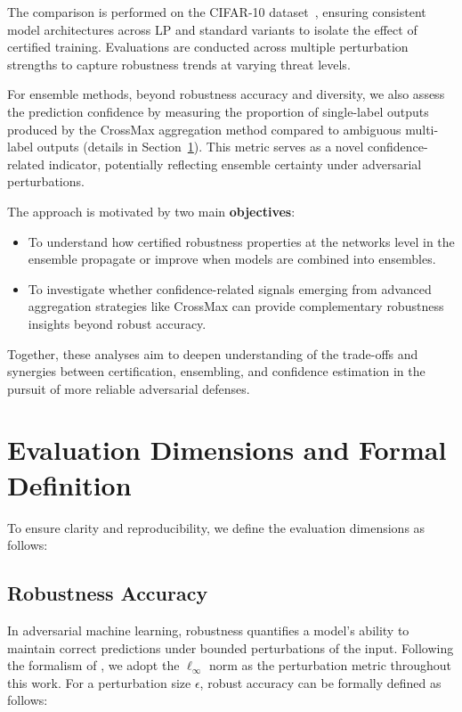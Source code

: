 The comparison is performed on the CIFAR-10 dataset~\cite{krizhevsky2009learning}, ensuring consistent model architectures across LP and standard variants to isolate the effect of certified training. Evaluations are conducted across multiple perturbation strengths to capture robustness trends at varying threat levels.

For ensemble methods, beyond robustness accuracy and diversity, we also assess the prediction confidence by measuring the proportion of single-label outputs produced by the CrossMax aggregation method compared to ambiguous multi-label outputs (details in Section~\ref{sec:evaluation dimensions}). This metric serves as a novel confidence-related indicator, potentially reflecting ensemble certainty under adversarial perturbations.

The approach is motivated by two main \textbf{objectives}:
\begin{itemize}

    \item To understand how certified robustness properties at the networks  level in the ensemble propagate or improve when models are combined into ensembles.
    \item To investigate whether confidence-related signals emerging from advanced aggregation strategies like CrossMax can provide complementary robustness insights beyond robust accuracy.
\end{itemize}

Together, these analyses aim to deepen understanding of the trade-offs and synergies between certification, ensembling, and confidence estimation in the pursuit of more reliable adversarial defenses.

\section{Evaluation Dimensions and Formal Definition}
\label{sec:evaluation dimensions}
\indent


To ensure clarity and reproducibility, we define the evaluation dimensions as follows:

\subsection{Robustness Accuracy}
\indent

In adversarial machine learning, robustness quantifies a model's ability to maintain correct predictions under bounded perturbations of the input.  
Following the formalism of \cite{kielhofer2025robustness}, we adopt the $\ell_\infty$ norm as the perturbation metric throughout this work.  
For a perturbation size $\epsilon$, robust accuracy can be formally defined as follows:

